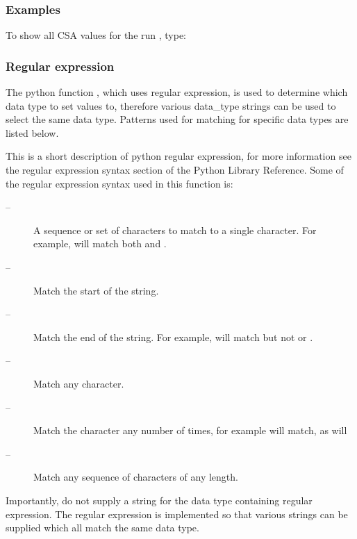   
 \subsubsection{Examples} 

 To show all CSA values for the run , type: 
  


  
 \subsubsection{Regular expression} 

 The python function , which uses regular expression, is used to determine which data type to set values to, therefore various data\_type strings can be used to select the same data type.  Patterns used for matching for specific data types are listed below. 
  

 This is a short description of python regular expression, for more information see the regular expression syntax section of the Python Library Reference.  Some of the regular expression syntax used in this function is: 
  

 \begin{description} 
 \item[\quotecmd{[]} --]  A sequence or set of characters to match to a single character.  For example,  will match both  and .  
 \item[\quotecmd{\^{}} --]  Match the start of the string.  
 \item[\quotecmd{\$} --]  Match the end of the string.  For example,  will match  but not  or .  
 \item[ --]  Match any character.  
 \item[ --]  Match the character  any number of times, for example  will match, as will   
 \item[ --]  Match any sequence of characters of any length.  
 \end{description} 
  

 Importantly, do not supply a string for the data type containing regular expression.  The regular expression is implemented so that various strings can be supplied which all match the same data type. 
  

